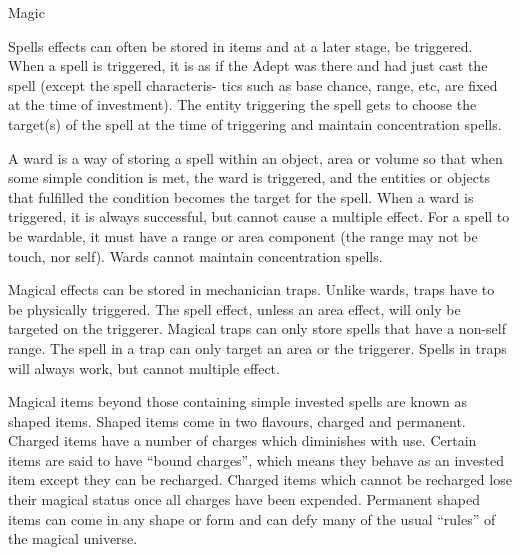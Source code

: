 \begin{Chapter}{Magic}
\begin{Description}
\item[Investment] Spells effects can often be stored in items and at a
  later stage, be triggered.  When a spell is triggered, it is as if
  the Adept was there and had just cast the spell (except the spell
  characteris- tics such as base chance, range, etc, are fixed at the
  time of investment). The entity triggering the spell gets to choose
  the target(s) of the spell at the time of triggering and maintain
  concentration spells.

\item[Ward] A ward is a way of storing a spell within an object, area
  or volume so that when some simple condition is met, the ward is
  triggered, and the entities or objects that fulfilled the condition
  becomes the target for the spell.  When a ward is triggered, it is
  always successful, but cannot cause a multiple effect. For a spell
  to be wardable, it must have a range or area component (the range
  may not be touch, nor self). Wards cannot maintain concentration
  spells.

\item[Magical Trap] Magical effects can be stored in mechanician
  traps.  Unlike wards, traps have to be physically triggered.  The
  spell effect, unless an area effect, will only be targeted on the
  triggerer.  Magical traps can only store spells that have a non-self
  range.  The spell in a trap can only target an area or the
  triggerer.  Spells in traps will always work, but cannot multiple
  effect.

\item[Shaped Magic] Magical items beyond those containing simple
  invested spells are known as shaped items. Shaped items come in two
  flavours, charged and permanent.  Charged items have a number of
  charges which diminishes with use.  Certain items are said to have
  “bound charges”, which means they behave as an invested item except
  they can be recharged.  Charged items which cannot be recharged lose
  their magical status once all charges have been expended.  Permanent
  shaped items can come in any shape or form and can defy many of the
  usual “rules” of the magical universe.

\end{Description}

\end{Chapter}
